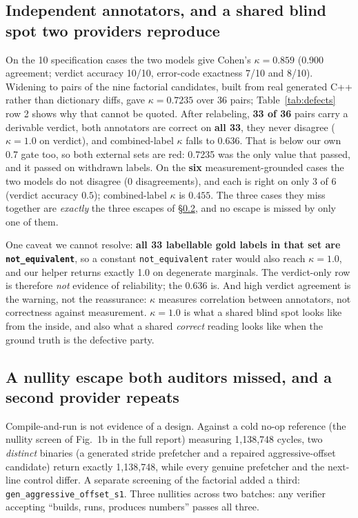 \documentclass[sigconf,anonymous,nonacm]{acmart}
\begin{document}
\subsection{Independent annotators, and a shared blind spot two providers reproduce}
\label{sec:audit}

On the 10 specification cases the two models give Cohen's $\kappa=\mathbf{0.859}$ (0.900 agreement; verdict accuracy 10/10, error-code exactness 7/10 and 8/10). Widening to pairs of the nine factorial candidates, built from real generated C++ rather than dictionary diffs, gave $\kappa=0.7235$ over 36 pairs; Table~\ref{tab:defects} row 2 shows why that cannot be quoted. After relabeling, \textbf{33 of 36} pairs carry a derivable verdict, both annotators are correct on \textbf{all 33}, they never disagree ($\kappa=1.0$ on verdict), and combined-label $\kappa$ falls to $\mathbf{0.636}$. That is below our own 0.7 gate too, so both external sets are red: 0.7235 was the only value that passed, and it passed on withdrawn labels. On the \textbf{six} measurement-grounded cases the two models do not disagree (0 disagreements), and each is right on only 3 of 6 (verdict accuracy $\mathbf{0.5}$); combined-label $\kappa$ is $\mathbf{0.455}$. The three cases they miss together are \emph{exactly} the three escapes of \S\ref{sec:escape}, and no escape is missed by only one of them.

One caveat we cannot resolve: \textbf{all 33 labellable gold labels in that set are \texttt{not\_equivalent}}, so a constant \texttt{not\_equivalent} rater would also reach $\kappa=1.0$, and our helper returns exactly 1.0 on degenerate marginals. The verdict-only row is therefore \emph{not} evidence of reliability; the 0.636 is. And high verdict agreement is the warning, not the reassurance: $\kappa$ measures correlation between annotators, not correctness against measurement. $\kappa=1.0$ is what a shared blind spot looks like from the inside, and also what a shared \emph{correct} reading looks like when the ground truth is the defective party.

\subsection{A nullity escape both auditors missed, and a second provider repeats}
\label{sec:escape}

Compile-and-run is not evidence of a design. Against a cold no-op reference (the nullity screen of Fig.~1b in the full report) measuring 1{,}138{,}748 cycles, two \emph{distinct} binaries (a generated stride prefetcher and a repaired aggressive-offset candidate) return exactly 1{,}138{,}748, while every genuine prefetcher and the next-line control differ. A separate screening of the factorial added a third: \texttt{gen\_aggressive\_offset\_s1}. Three nullities across two batches: any verifier accepting ``builds, runs, produces numbers'' passes all three.
\end{document}
